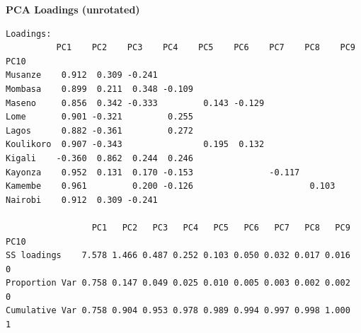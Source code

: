 \documentclass[12pt,a4paper]{article}
\begin{document}
\textbf{PCA Loadings (unrotated)}
\begin{verbatim}
Loadings:
          PC1    PC2    PC3    PC4    PC5    PC6    PC7    PC8    PC9    PC10  
Musanze    0.912  0.309 -0.241                                                 
Mombasa    0.899  0.211  0.348 -0.109                                          
Maseno     0.856  0.342 -0.333         0.143 -0.129                            
Lome       0.901 -0.321         0.255                                          
Lagos      0.882 -0.361         0.272                                          
Koulikoro  0.907 -0.343                0.195  0.132                            
Kigali    -0.360  0.862  0.244  0.246                                          
Kayonza    0.952  0.131  0.170 -0.153               -0.117                     
Kamembe    0.961         0.200 -0.126                       0.103              
Nairobi    0.912  0.309 -0.241                                                 

                 PC1   PC2   PC3   PC4   PC5   PC6   PC7   PC8   PC9 PC10
SS loadings    7.578 1.466 0.487 0.252 0.103 0.050 0.032 0.017 0.016    0
Proportion Var 0.758 0.147 0.049 0.025 0.010 0.005 0.003 0.002 0.002    0
Cumulative Var 0.758 0.904 0.953 0.978 0.989 0.994 0.997 0.998 1.000    1
\end{verbatim}
\end{document}
